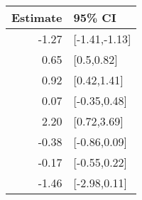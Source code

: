 \begin{tabular}{rl}
  \hline
Estimate & 95\% CI \\ 
  \hline
-1.27 & [-1.41,-1.13] \\ 
  0.65 & [0.5,0.82] \\ 
  0.92 & [0.42,1.41] \\ 
  0.07 & [-0.35,0.48] \\ 
  2.20 & [0.72,3.69] \\ 
  -0.38 & [-0.86,0.09] \\ 
  -0.17 & [-0.55,0.22] \\ 
  -1.46 & [-2.98,0.11] \\ 
   \hline
\end{tabular}


